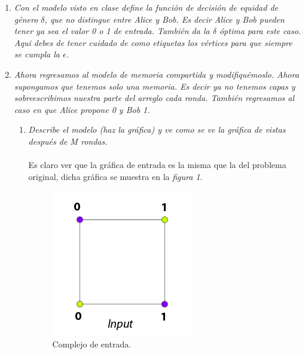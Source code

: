 \documentclass{article}
\begin{document}
\begin{enumerate}
\item{
    \textsl{
    Con el modelo visto en clase define la función de decisión de equidad de género
    $\delta$, que no distingue entre Alice y Bob. Es decir Alice y Bob pueden tener
    ya sea el valor 0 o 1 de entrada. También da la $\delta$ óptima para este caso.
    Aqui debes de tener cuidado de como etiquetas los vértices para que siempre
    se cumpla la $\epsilon$.}
  }

\item{
    
    \textsl{
    Ahora regresamos al modelo de memoria compartida y modifiquémoslo. Ahora 
    supongamos que tenemos solo una memoria. Es decir ya no tenemos capas y
    sobreescribimos nuestra parte del arreglo cada ronda. También regresamos
    al caso en que Alice propone 0 y Bob 1.}
    \begin{enumerate}
      
    \item{\textsl{Describe el modelo (haz la gráfica) y ve como se ve la gráfica de 
        vistas después de M rondas.}\\
      \\
      Es claro ver que la gráfica de entrada es la misma que la del problema original,
      dicha gráfica se muestra en la \textit{figura 1}.\\
      
      \begin{figure}
        \centering
        \includegraphics[scale=0.6]{3a_input.png}
        \caption{Complejo de entrada.}
      \end{figure}
      
}
\end{enumerate}}
\end{enumerate}
\end{document}
